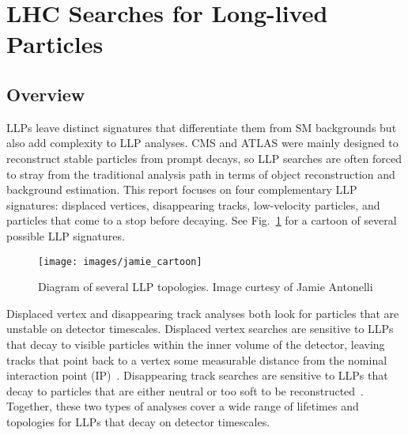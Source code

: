 \documentclass[12pt]{article}
\begin{document}
\section{LHC Searches for Long-lived Particles} \label {analyses}
    \subsection{Overview}
        LLPs leave distinct signatures that differentiate them from SM backgrounds but also add complexity to LLP analyses. CMS and ATLAS were mainly designed to reconstruct stable particles from prompt decays, so LLP searches are often forced to stray from the traditional analysis path in terms of object reconstruction and background estimation. This report focuses on four complementary LLP signatures: displaced vertices, disappearing tracks, low-velocity particles, and particles that come to a stop before decaying. See Fig.~\ref{jamie_cartoon} for a cartoon of several possible LLP signatures.

        \noindent \begin{figure}[htbp] \begin{center}
        \texttt{[image: images/jamie\_cartoon]}
        \caption{Diagram of several LLP topologies. Image curtesy of Jamie Antonelli}
        \label{jamie_cartoon}
        \end{center} \end{figure}

        Displaced vertex and disappearing track analyses both look for particles that are unstable on detector timescales. Displaced vertex searches are sensitive to LLPs that decay to visible particles within the inner volume  of the detector, leaving tracks that point back to a vertex some measurable distance from the nominal interaction point (IP)~\cite{atlas_displaced}. Disappearing track searches are sensitive to LLPs that decay to particles that are either neutral or too soft to be reconstructed~\cite{atlas_disappearing}. Together, these two types of analyses cover a wide range of lifetimes and topologies for LLPs that decay on detector timescales.
\end{document}
